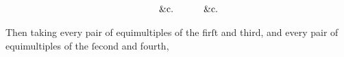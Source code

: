 \documentclass[12pt,preview]{standalone}
\begin{document}
\begin{minipage}{\textwidth}
\[\begin{aligned}
             & \hspace{5ex}\text{\&c.}                                                                                                                                                                                                                                                                                                                                                                                                                                                                                                                                                                                                                                                                                                                                                                                                                                                   &  & \hspace{5ex}\text{\&c.}                                                                                                                                                                                                                                                                                                                                                                                                                                                                                                                                                                                                                                                                                                                                                                                                                                                                                                                                                                          \\
        \end{aligned}
    \]

    \hfill

    Then taking every pair of equimultiples of the firſt and third, and every pair of equimultiples of the ſecond and fourth,

    \hfill


\end{minipage}
\end{document}
